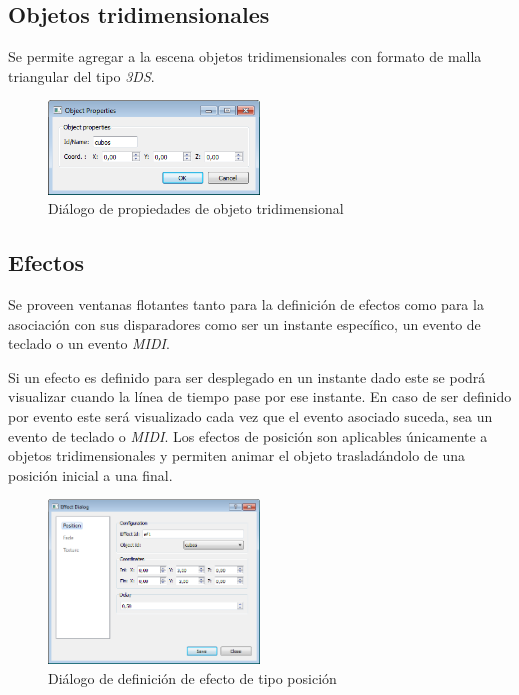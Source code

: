 \subsection{Objetos tridimensionales}

Se permite agregar a la escena objetos tridimensionales con formato de malla triangular del tipo \emph{3DS}.

\begin{figure}[H]
  \centering
    \includegraphics[width=0.5\textwidth]{./Cap5_vmt/vmt_objectProperties.png}
  \caption{Diálogo de propiedades de objeto tridimensional}
  \label{fig:VMT-ObjectProperties}
\end{figure}

\subsection{Efectos}

Se proveen ventanas flotantes tanto para la definición de efectos como para la asociación con sus disparadores como ser un instante específico, un evento de teclado o un evento \emph{MIDI}.

Si un efecto es definido para ser desplegado en un instante dado este se podrá visualizar cuando la línea de tiempo pase por ese instante. En caso de ser definido por evento este será visualizado cada vez que el evento asociado suceda, sea un evento de teclado o \emph{MIDI}.
Los efectos de posición son aplicables únicamente a objetos tridimensionales y permiten animar el objeto trasladándolo de una posición inicial a una final.

\begin{figure}[H]
  \centering
    \includegraphics[width=0.5\textwidth]{./Cap5_vmt/vmt_EfectDialog1.png}
  \caption{Diálogo de definición de efecto de tipo posición}
  \label{fig:VMT-EffectPossition}
\end{figure}

